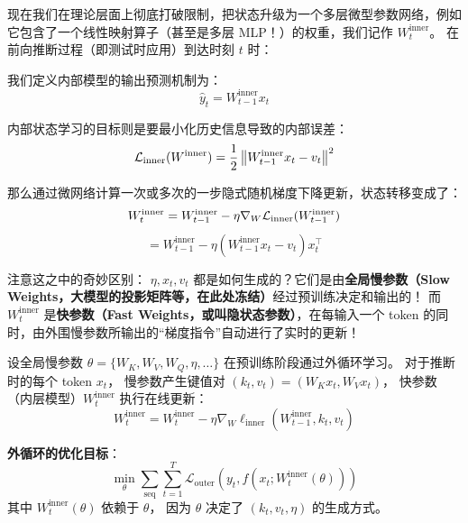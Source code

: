 现在我们在理论层面上彻底打破限制，把状态升级为一个多层微型参数网络，例如它包含了一个线性映射算子（甚至是多层 MLP！）的权重，我们记作 $W_t^\text{inner}$。
在前向推断过程（即测试时应用）到达时刻 $t$ 时：

我们定义内部模型的输出预测机制为：
\begin{equation}
  \hat{y}_t = W_{t-1}^\text{inner} x_t
\end{equation}

内部状态学习的目标则是要最小化历史信息导致的内部误差：
\begin{equation}
 \mathcal{L}_{\mathrm{inner}}(W^\text{inner}) = \frac{1}{2}\left\| W_{t-1}^\text{inner} x_t - v_t \right\|^2
\end{equation}

那么通过微网络计算一次或多次的一步隐式随机梯度下降更新，状态转移变成了：
\begin{equation}
  W_t^\text{inner} = W_{t-1}^\text{inner} - \eta \nabla_{W} \mathcal{L}_{\mathrm{inner}}(W_{t-1}^\text{inner})
\end{equation}
\begin{equation}
  = W_{t-1}^\text{inner} - \eta (W_{t-1}^\text{inner} x_t - v_t)x_t^\top
\end{equation}

\begin{insight}[title=双重参数界限]
注意这之中的奇妙区别：
$\eta, x_t, v_t$ 都是如何生成的？它们是由\textbf{全局慢参数（Slow Weights，大模型的投影矩阵等，在此处冻结）}经过预训练决定和输出的！
而 $W_t^\text{inner}$ 是\textbf{快参数（Fast Weights，或叫隐状态参数）}，在每输入一个 token 的同时，由外围慢参数所输出的“梯度指令”自动进行了实时的更新！
\end{insight}

\begin{definition}
\label{def:l2l}
设全局慢参数 $\theta = \{W_K, W_V, W_Q, \eta, \ldots\}$
在预训练阶段通过外循环学习。
对于推断时的每个 token $x_t$，
慢参数产生键值对 $(k_t, v_t) = (W_K x_t, W_V x_t)$，
快参数（内层模型）$W_t^{\text{inner}}$ 执行在线更新：
\begin{equation}
  W_t^{\text{inner}} = W_t^{\text{inner}}
  - \eta \nabla_{W} \ell_{\text{inner}}(W_{t-1}^{\text{inner}}, k_t, v_t)
  \label{eq:l2l_update}
\end{equation}

\textbf{外循环的优化目标}：
\begin{equation}
  \min_\theta \sum_{\text{seq}} \sum_{t=1}^{T}
  \mathcal{L}_{\text{outer}}(y_t, f(x_t; W_t^{\text{inner}}(\theta)))
  \label{eq:l2l_outer}
\end{equation}
其中 $W_t^{\text{inner}}(\theta)$ 依赖于 $\theta$，
因为 $\theta$ 决定了 $(k_t, v_t, \eta)$ 的生成方式。
\end{definition}

